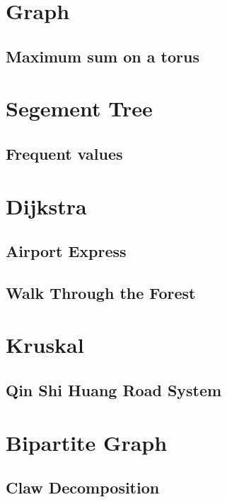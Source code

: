\section{Graph}
        \subsection{Maximum sum on a torus}
                

\section{Segement Tree}
        \subsection{Frequent values}
                

\section{Dijkstra}
        \subsection{Airport Express}
                
        \subsection{Walk Through the Forest}
                

\section{Kruskal}
        \subsection{Qin Shi Huang Road System}
                

\section{Bipartite Graph}
        \subsection{Claw Decomposition}
                
